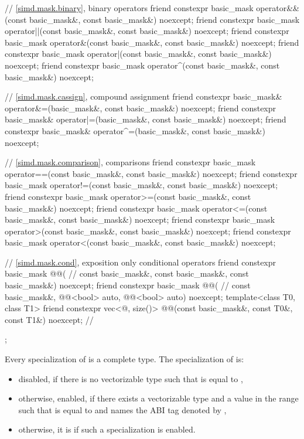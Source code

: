 \begin{codeblock}
{{    // \ref{simd.mask.binary},  binary operators
    friend constexpr basic_mask
      operator&&(const basic_mask&, const basic_mask&) noexcept;
    friend constexpr basic_mask
      operator||(const basic_mask&, const basic_mask&) noexcept;
    friend constexpr basic_mask
      operator&(const basic_mask&, const basic_mask&) noexcept;
    friend constexpr basic_mask
      operator|(const basic_mask&, const basic_mask&) noexcept;
    friend constexpr basic_mask
      operator^(const basic_mask&, const basic_mask&) noexcept;

    // \ref{simd.mask.cassign},  compound assignment
    friend constexpr basic_mask&
      operator&=(basic_mask&, const basic_mask&) noexcept;
    friend constexpr basic_mask&
      operator|=(basic_mask&, const basic_mask&) noexcept;
    friend constexpr basic_mask&
      operator^=(basic_mask&, const basic_mask&) noexcept;

    // \ref{simd.mask.comparison},  comparisons
    friend constexpr basic_mask
      operator==(const basic_mask&, const basic_mask&) noexcept;
    friend constexpr basic_mask
      operator!=(const basic_mask&, const basic_mask&) noexcept;
    friend constexpr basic_mask
      operator>=(const basic_mask&, const basic_mask&) noexcept;
    friend constexpr basic_mask
      operator<=(const basic_mask&, const basic_mask&) noexcept;
    friend constexpr basic_mask
      operator>(const basic_mask&, const basic_mask&) noexcept;
    friend constexpr basic_mask
      operator<(const basic_mask&, const basic_mask&) noexcept;

    // \ref{simd.mask.cond},  exposition only conditional operators
    friend constexpr basic_mask @@( // \expos
      const basic_mask&, const basic_mask&, const basic_mask&) noexcept;
    friend constexpr basic_mask @@( // \expos
      const basic_mask&, @@<bool> auto, @@<bool> auto) noexcept;
    template<class T0, class T1>
      friend constexpr vec<@\seebelow@, size()>
        @@(const basic_mask&, const T0&, const T1&) noexcept; // \expos
  };
}
\end{codeblock}

\pnum
Every specialization of  is a complete type.
The specialization of  is:
\begin{itemize}
 \item
   disabled, if there is no vectorizable type  such that 
   is equal to ,
 \item
   otherwise, enabled, if there exists a vectorizable type  and a
   value  in the range 
   such that  is equal to  and
    names the ABI tag denoted by ,
 \item
   otherwise, it is  if such a specialization is enabled.
\end{itemize}

